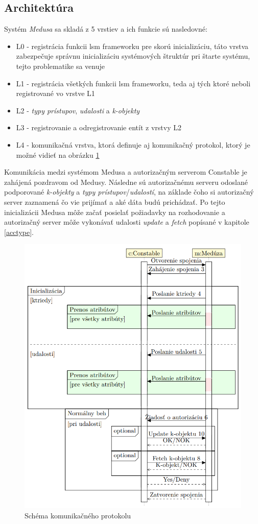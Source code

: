 \subsection{Architektúra}
Systém \textit{Medusa} sa skladá z 5 vrstiev a ich funkcie sú nasledovné:
\begin{itemize}
\item L0 - registrácia funkcii \acrshort{lsm} frameworku pre skorú inicializáciu, táto vrstva zabezpečuje správnu inicializáciu systémových štruktúr pri štarte systému, tejto problematike sa venuje \cite{medusatim}
\item L1 - registrácia všetkých funkcii \acrshort{lsm} frameworku, teda aj tých ktoré neboli registrované vo vrstve L1
\item L2 - \textit{typy prístupov}, \textit{udalosti} a \textit{k-objekty}
\item L3 - registrovanie a odregistrovanie entít z vrstvy L2
\item L4 - komunikačná vrstva, ktorá definuje aj komunikačný protokol, ktorý je možné vidieť na obrázku \ref{medusakomunikacia}
\end{itemize}
Komunikácia medzi systémom Medusa a autorizačným serverom Constable je zahájená pozdravom od Medusy. Následne  sú autorizačnému serveru odoslané podporované \textit{k-objekty} a \textit{typy prístupov}/\textit{udalostí}, na základe čoho si autorizačný server zaznamená čo vie prijímať a aké dáta budú prichádzať. Po tejto inicializácii Medusa môže začať posielať požiadavky na rozhodovanie a autorizačný server môže vykonávať udalosti \textit{update} a \textit{fetch} popísané v kapitole \ref{acctype}.
\begin{figure}[!htbp]
  \centering
  \includegraphics[width=12cm]{img/komunikacia.png}
  \caption{Schéma komunikačného protokolu\cite{kacer}}
  \label{medusakomunikacia}
\end{figure}

